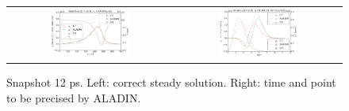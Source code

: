 \documentclass[preprint,12pt]{elsarticle}
\newcommand{\figscale}{0.5}
\begin{document}
\begin{figure}[tbh]
  \begin{center}
    \begin{tabular}{cc}
      \includegraphics[width=\figscale\textwidth]{../VFPdata/C7_Aladin_case3_heatflux.png} &
      \includegraphics[width=\figscale\textwidth]{../VFPdata/C7_Aladin_case3_kinetics.png}
    \end{tabular}
  \caption{  
  Snapshot 12 ps. Left: correct steady solution. Right: time and point to be precised by ALADIN.
  }
  \end{center}
  \label{fig:C7_ALADIN_case3}
\end{figure}
\end{document}

